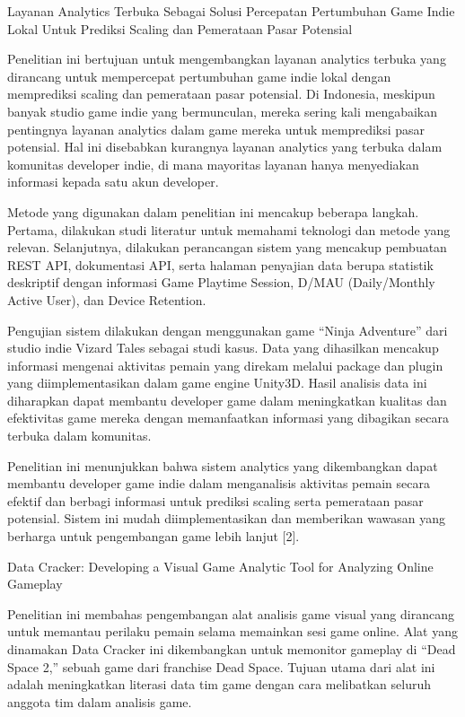 Layanan Analytics Terbuka Sebagai Solusi Percepatan Pertumbuhan Game Indie Lokal Untuk Prediksi Scaling dan Pemerataan Pasar Potensial

Penelitian ini bertujuan untuk mengembangkan layanan analytics terbuka yang dirancang untuk mempercepat pertumbuhan game indie lokal dengan memprediksi scaling dan pemerataan pasar potensial. Di Indonesia, meskipun banyak studio game indie yang bermunculan, mereka sering kali mengabaikan pentingnya layanan analytics dalam game mereka untuk memprediksi pasar potensial. Hal ini disebabkan kurangnya layanan analytics yang terbuka dalam komunitas developer indie, di mana mayoritas layanan hanya menyediakan informasi kepada satu akun developer.

Metode yang digunakan dalam penelitian ini mencakup beberapa langkah. Pertama, dilakukan studi literatur untuk memahami teknologi dan metode yang relevan. Selanjutnya, dilakukan perancangan sistem yang mencakup pembuatan REST API, dokumentasi API, serta halaman penyajian data berupa statistik deskriptif dengan informasi Game Playtime Session, D/MAU (Daily/Monthly Active User), dan Device Retention.

Pengujian sistem dilakukan dengan menggunakan game “Ninja Adventure” dari studio indie Vizard Tales sebagai studi kasus. Data yang dihasilkan mencakup informasi mengenai aktivitas pemain yang direkam melalui package dan plugin yang diimplementasikan dalam game engine Unity3D. Hasil analisis data ini diharapkan dapat membantu developer game dalam meningkatkan kualitas dan efektivitas game mereka dengan memanfaatkan informasi yang dibagikan secara terbuka dalam komunitas.

Penelitian ini menunjukkan bahwa sistem analytics yang dikembangkan dapat membantu developer game indie dalam menganalisis aktivitas pemain secara efektif dan berbagi informasi untuk prediksi scaling serta pemerataan pasar potensial. Sistem ini mudah diimplementasikan dan memberikan wawasan yang berharga untuk pengembangan game lebih lanjut [2].

Data Cracker: Developing a Visual Game Analytic Tool for Analyzing Online Gameplay

Penelitian ini membahas pengembangan alat analisis game visual yang dirancang untuk memantau perilaku pemain selama memainkan sesi game online. Alat yang dinamakan Data Cracker ini dikembangkan untuk memonitor gameplay di “Dead Space 2,” sebuah game dari franchise Dead Space. Tujuan utama dari alat ini adalah meningkatkan literasi data tim game dengan cara melibatkan seluruh anggota tim dalam analisis game.

